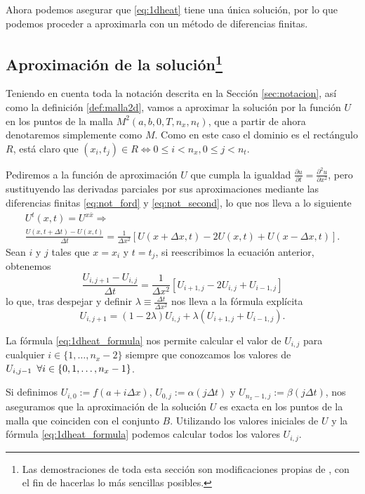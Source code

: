 Ahora podemos asegurar que \eqref{eq:1dheat} tiene una única solución, por lo que podemos proceder a aproximarla con un método de diferencias finitas.

\subsection[Aproximación de la solución]{Aproximación de la solución\footnote{Las demostraciones de toda esta sección son modificaciones propias de \cite{1dheat}, con el fin de hacerlas lo más sencillas posibles.}}
Teniendo en cuenta toda la notación descrita en la Sección \ref{sec:notacion}, así como la definición \ref{def:malla2d}, vamos a aproximar la solución por la función $U$ en los puntos de la malla $M^2(a,b,0,T,n_x,n_t)$, que a partir de ahora denotaremos simplemente como $M$. Como en este caso el dominio es el rectángulo $R$, está claro que $(x_i,t_j)\in R \iff 0\leq i < n_x, 0\leq j < n_t$.

Pediremos a la función de aproximación $U$ que cumpla la igualdad $\frac{\partial u}{\partial t} = \frac{\partial ^2u}{\partial x^2}$, pero sustituyendo las derivadas parciales por sus aproximaciones mediante las diferencias finitas \eqref{eq:not_ford} y \eqref{eq:not_second}, lo que nos lleva a lo siguiente
\begin{multline} \label{eq:principio_aprox}
	U^t(x,t) = U^{x\bar{x}} \Rightarrow \\ \frac{U(x,t+\Delta t)-U(x,t)}{\Delta t} = \frac{1}{\Delta x^2}[U(x+\Delta x,t)-2U(x,t)+U(x-\Delta x, t)].
\end{multline}
Sean $i$ y $j$ tales que $x=x_i$ y $t=t_j$, si reescribimos la ecuación anterior, obtenemos
\begin{equation}
	\frac{U_{i,j+1}-U_{i,j}}{\Delta t} = \frac{1}{\Delta x^2}[U_{i+1,j}-2U_{i,j}+U_{i-1,j}]
\end{equation}
lo que, tras despejar y definir $\lambda \equiv \frac{\Delta t}{\Delta x^2}$ nos lleva a la fórmula explícita
\begin{equation}\label{eq:1dheat_formula}
	U_{i,j+1} = (1-2\lambda)U_{i,j}+\lambda(U_{i+1,j}+U_{i-1,j}).
\end{equation}

La fórmula \eqref{eq:1dheat_formula} nos permite calcular el valor de $U_{i,j}$ para cualquier $i\in\{1,\dots,n_x-2\}$ siempre que conozcamos los valores de $U_{i,j-1} \hspace{5px} \forall i\in\{0,1,\dots,n_x-1\}$.

Si definimos $U_{i,0}:=f(a+i\Delta x)$, $U_{0,j}:=\alpha(j\Delta t)$ y $U_{n_x-1,j}:=\beta(j\Delta t)$, nos aseguramos que la aproximación de la solución $U$ es exacta en los puntos de la malla que coinciden con el conjunto $B$. Utilizando los valores iniciales de $U$ y la fórmula \eqref{eq:1dheat_formula} podemos calcular todos los valores $U_{i,j}$.

